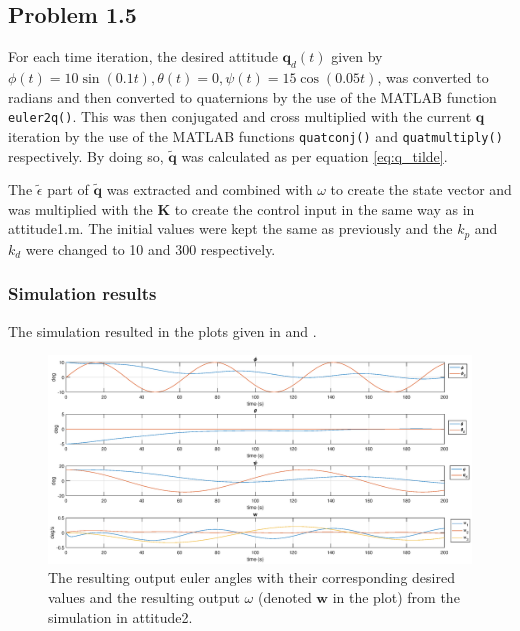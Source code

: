 
\subsection*{Problem 1.5}
For each time iteration, the desired attitude $\mathbf{q}_d(t)$ given by $\phi(t) = 10\sin(0.1t), \theta(t) = 0, \psi(t) = 15\cos(0.05t)$, was converted to radians and then converted to quaternions by the use of the MATLAB function \texttt{euler2q()}. This was then conjugated and cross multiplied with the current $\mathbf{q}$ iteration by the use of the MATLAB functions \texttt{quatconj()} and \texttt{quatmultiply()} respectively. By doing so, $\mathbf{\tilde{q}}$ was calculated as per equation \eqref{eq:q_tilde}.

The $\tilde{\epsilon}$ part of $\mathbf{\tilde{q}}$ was extracted and combined with $\omega$ to create the state vector and was multiplied with the $\mathbf{K}$ to create the control input in the same way as in {\color{blue} attitude1.m}. The initial values were kept the same as previously and the $k_p$ and $k_d$ were changed to 10 and 300 respectively. 

\subsubsection*{Simulation results}

The simulation resulted in the plots given in  and .

\begin{figure}
	\centering
	\includegraphics[width=1.00\textwidth]{figures/2_euler.eps}
	\caption{The resulting output euler angles with their corresponding desired values and the resulting output $\omega$ (denoted $\mathbf{w}$ in the plot) from the simulation in attitude2.}
\label{fig:sim_attitude2_euler}
\end{figure}

